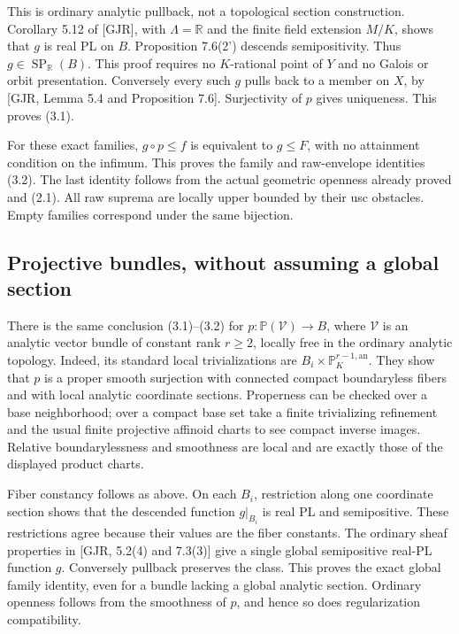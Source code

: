 \documentclass[11pt,a4paper]{article}
\begin{document}
This is ordinary analytic pullback, not a topological section construction. Corollary 5.12 of [GJR], with \(\Lambda=\mathbb R\) and the finite field extension \(M/K\), shows that \(g\) is real PL on \(B\). Proposition 7.6(2') descends semipositivity. Thus \(g\in\operatorname{SP}_{\mathbb R}(B)\). This proof requires no \(K\)-rational point of \(Y\) and no Galois or orbit presentation. Conversely every such \(g\) pulls back to a member on \(X\), by [GJR, Lemma 5.4 and Proposition 7.6]. Surjectivity of \(p\) gives uniqueness. This proves (3.1).

For these exact families, \(g\circ p\leq f\) is equivalent to \(g\leq F\), with no attainment condition on the infimum. This proves the family and raw-envelope identities (3.2). The last identity follows from the actual geometric openness already proved and (2.1). All raw suprema are locally upper bounded by their usc obstacles. Empty families correspond under the same bijection.

\subsection*{Projective bundles, without assuming a global section}

There is the same conclusion (3.1)--(3.2) for \(p:\mathbb P(\mathcal V)\to B\), where \(\mathcal V\) is an analytic vector bundle of constant rank \(r\geq2\), locally free in the ordinary analytic topology. Indeed, its standard local trivializations are \(B_i\times\mathbb P_K^{r-1,\mathrm{an}}\). They show that \(p\) is a proper smooth surjection with connected compact boundaryless fibers and with local analytic coordinate sections. Properness can be checked over a base neighborhood; over a compact base set take a finite trivializing refinement and the usual finite projective affinoid charts to see compact inverse images. Relative boundarylessness and smoothness are local and are exactly those of the displayed product charts.

Fiber constancy follows as above. On each \(B_i\), restriction along one coordinate section shows that the descended function \(g|_{B_i}\) is real PL and semipositive. These restrictions agree because their values are the fiber constants. The ordinary sheaf properties in [GJR, 5.2(4) and 7.3(3)] give a single global semipositive real-PL function \(g\). Conversely pullback preserves the class. This proves the exact global family identity, even for a bundle lacking a global analytic section. Ordinary openness follows from the smoothness of \(p\), and hence so does regularization compatibility.
\end{document}
